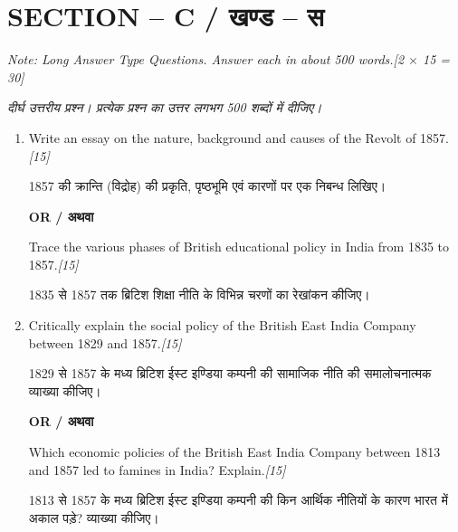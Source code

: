 \documentclass[11pt,a4paper]{article}
\newcommand{\pts}[1]{\hfill \textit{[#1]}}
\begin{document}
\bigskip

\section*{SECTION -- C / खण्ड -- स}
\noindent \textit{Note: Long Answer Type Questions. Answer each in about 500 words.}\pts{2 $\times$ 15 = 30}

\noindent \textit{दीर्घ उत्तरीय प्रश्न। प्रत्येक प्रश्न का उत्तर लगभग 500 शब्दों में दीजिए।}

\begin{enumerate}[label=\textbf{\arabic*.},leftmargin=*,start=5,itemsep=14pt]

  \item Write an essay on the nature, background and causes of the Revolt of 1857.\pts{15}
  
  1857 की क्रान्ति (विद्रोह) की प्रकृति, पृष्ठभूमि एवं कारणों पर एक निबन्ध लिखिए।

  \begin{center}\textbf{OR / अथवा}\end{center}

  Trace the various phases of British educational policy in India from 1835 to 1857.\pts{15}
  
  1835 से 1857 तक ब्रिटिश शिक्षा नीति के विभिन्न चरणों का रेखांकन कीजिए।

  \item Critically explain the social policy of the British East India Company between 1829 and 1857.\pts{15}
  
  1829 से 1857 के मध्य ब्रिटिश ईस्ट इण्डिया कम्पनी की सामाजिक नीति की समालोचनात्मक व्याख्या कीजिए।

  \begin{center}\textbf{OR / अथवा}\end{center}

  Which economic policies of the British East India Company between 1813 and 1857 led to famines in India? Explain.\pts{15}
  
  1813 से 1857 के मध्य ब्रिटिश ईस्ट इण्डिया कम्पनी की किन आर्थिक नीतियों के कारण भारत में अकाल पड़े? व्याख्या कीजिए।

\end{enumerate}
\end{document}
